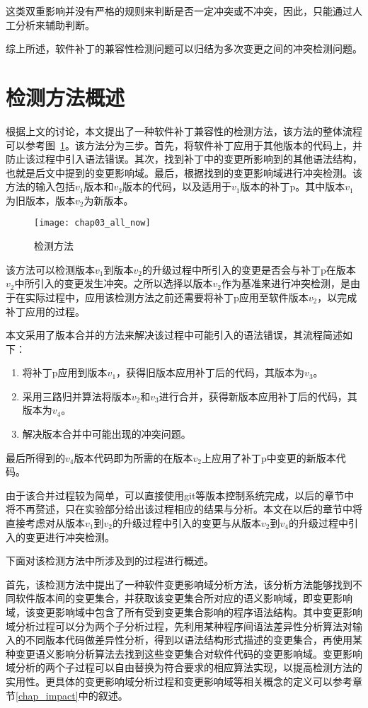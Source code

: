这类双重影响并没有严格的规则来判断是否一定冲突或不冲突，因此，只能通过人工分析来辅助判断。

综上所述，软件补丁的兼容性检测问题可以归结为多次变更之间的冲突检测问题。

\section{检测方法概述}
\label {sec_method}

根据上文的讨论，本文提出了一种软件补丁兼容性的检测方法，该方法的整体流程可以参考图~\ref{all_flow}。该方法分为三步。首先，将软件补丁应用于其他版本的代码上，并防止该过程中引入语法错误。其次，找到补丁中的变更所影响到的其他语法结构，也就是后文中提到的变更影响域。最后，根据找到的变更影响域进行冲突检测。该方法的输入包括$v_1$版本和$v_2$版本的代码，以及适用于$v_1$版本的补丁p。其中版本$v_1$为旧版本，版本$v_2$为新版本。

\begin{figure}[H]
	\centering
	\texttt{[image: chap03\_all\_now]}
	\caption {检测方法}
	\label {all_flow}	
\end{figure}

该方法可以检测版本$v_1$到版本$v_2$的升级过程中所引入的变更是否会与补丁p在版本$v_2$中所引入的变更发生冲突。之所以选择以版本$v_2$作为基准来进行冲突检测，是由于在实际过程中，应用该检测方法之前还需要将补丁p应用至软件版本$v_2$，以完成补丁应用的过程。

本文采用了版本合并的方法来解决该过程中可能引入的语法错误，其流程简述如下：
\begin{enumerate}
	\item 将补丁p应用到版本$v_1$，获得旧版本应用补丁后的代码，其版本为$v_3$。
	\item 采用三路归并算法将版本$v_2$和$v_3$进行合并，获得新版本应用补丁后的代码，其版本为$v_4$。
	\item 解决版本合并中可能出现的冲突问题。
\end{enumerate}

最后所得到的$v_4$版本代码即为所需的在版本$v_2$上应用了补丁p中变更的新版本代码。

由于该合并过程较为简单，可以直接使用git等版本控制系统完成，以后的章节中将不再赘述，只在实验部分给出该过程相应的结果与分析。本文在以后的章节中将直接考虑对从版本$v_1$到$v_2$的升级过程中引入的变更与从版本$v_2$到$v_4$的升级过程中引入的变更进行冲突检测。

下面对该检测方法中所涉及到的过程进行概述。

首先，该检测方法中提出了一种软件变更影响域分析方法，该分析方法能够找到不同软件版本间的变更集合，并获取该变更集合所对应的语义影响域，即变更影响域，该变更影响域中包含了所有受到变更集合影响的程序语法结构。其中变更影响域分析过程可以分为两个子分析过程，先利用某种程序间语法差异性分析算法对输入的不同版本代码做差异性分析，得到以语法结构形式描述的变更集合，再使用某种变更语义影响分析算法去找到这些变更集合对软件代码的变更影响域。变更影响域分析的两个子过程可以自由替换为符合要求的相应算法实现，以提高检测方法的实用性。更具体的变更影响域分析过程和变更影响域等相关概念的定义可以参考章节\ref {chap_impact}中的叙述。

